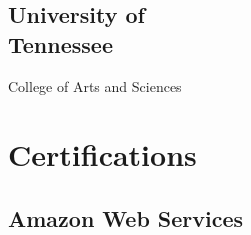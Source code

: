 \documentclass[]{plushcv}
\begin{document}
\begin{minipage}[t]{0.25\textwidth}
\sectionsep
\subsection{University of
\\Tennessee}
College of Arts and Sciences \\
\sectionsep


\section{Certifications} 
\subsection{Amazon Web Services}


\end{minipage} 


%
%

\newpage
\end{document}
